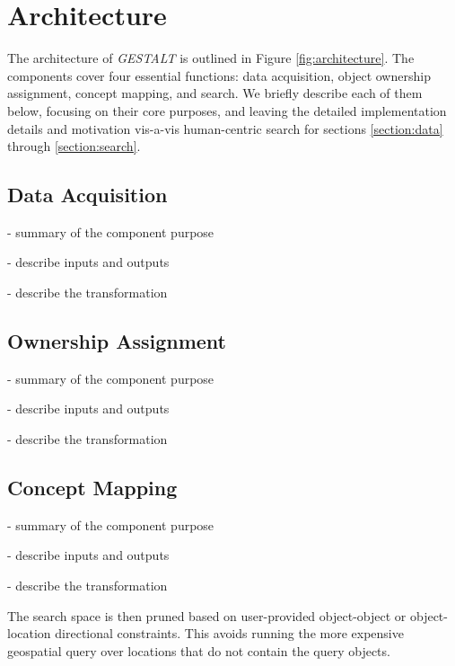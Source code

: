\section{Architecture}
\label{section:architecture}

\begin{figure*}[t]
    
    \centering
    \caption[width=\textwidth]{The architecture of \emph{GESTALT} consists of the data collection subsystem, the ownership assignment process, the concept mapping process and the search subsystem.}
    \label{fig:architecture}
\end{figure*}

The architecture of \textit{GESTALT} is outlined in Figure \ref{fig:architecture}. The components cover four essential functions: data acquisition, object ownership assignment, concept mapping, and search. We briefly describe each of them below, focusing on their core purposes, and leaving the detailed implementation details and motivation vis-a-vis human-centric search for sections \ref{section:data} through \ref{section:search}. 

\subsection{Data Acquisition}
- summary of the component purpose

- describe inputs and outputs

- describe the transformation


\subsection{Ownership Assignment}
- summary of the component purpose

- describe inputs and outputs

- describe the transformation


\subsection{Concept Mapping}
- summary of the component purpose

- describe inputs and outputs

- describe the transformation

The search space is then pruned based on user-provided object-object or object-location directional constraints.
This avoids running the more expensive geospatial query over locations that do not contain the query objects.



